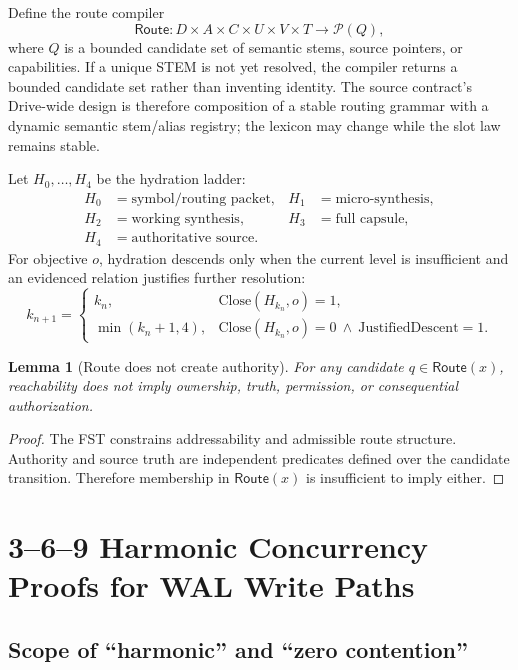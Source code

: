 \documentclass[11pt]{article}
\newtheorem{lemma}{Lemma}
\newcommand{\Route}{\mathsf{Route}}
\newcommand{\Pow}{\mathcal{P}}
\begin{document}
Define the route compiler
\[
\Route:D\times A\times C\times U\times V\times T\rightarrow\Pow(Q),
\]
where \(Q\) is a bounded candidate set of semantic stems, source pointers, or
capabilities.  If a unique STEM is not yet resolved, the compiler returns a
bounded candidate set rather than inventing identity.  The source contract's
Drive-wide design is therefore composition of a stable routing grammar with a
dynamic semantic stem/alias registry; the lexicon may change while the slot law
remains stable.

Let \(H_0,\ldots,H_4\) be the hydration ladder:
\[
\begin{aligned}
H_0&=\text{symbol/routing packet}, & H_1&=\text{micro-synthesis},\\
H_2&=\text{working synthesis}, & H_3&=\text{full capsule},\\
H_4&=\text{authoritative source}. &&
\end{aligned}
\]
For objective \(o\), hydration descends only when the current level is
insufficient and an evidenced relation justifies further resolution:
\[
k_{n+1}=
\begin{cases}
k_n,&\mathrm{Close}(H_{k_n},o)=1,\\
\min(k_n+1,4),&\mathrm{Close}(H_{k_n},o)=0\ \land\ \mathrm{JustifiedDescent}=1.
\end{cases}
\]

\begin{lemma}[Route does not create authority]
For any candidate \(q\in\Route(x)\), reachability does not imply ownership,
truth, permission, or consequential authorization.
\end{lemma}

\begin{proof}
The FST constrains addressability and admissible route structure.  Authority and
source truth are independent predicates defined over the candidate transition.
Therefore membership in \(\Route(x)\) is insufficient to imply either.
\end{proof}

\section{3--6--9 Harmonic Concurrency Proofs for WAL Write Paths}

\subsection{Scope of ``harmonic'' and ``zero contention''}
\end{document}
